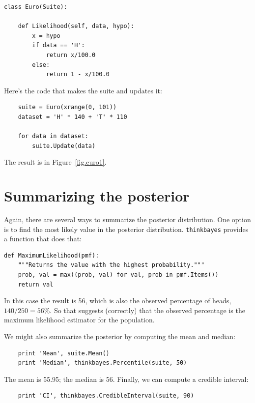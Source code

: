 \documentclass[12pt]{book}
\begin{document}
\begin{verbatim}
class Euro(Suite):

    def Likelihood(self, data, hypo):
        x = hypo
        if data == 'H':
            return x/100.0
        else:
            return 1 - x/100.0
\end{verbatim}

Here's the code that makes the suite and updates it:

\begin{verbatim}
    suite = Euro(xrange(0, 101))
    dataset = 'H' * 140 + 'T' * 110

    for data in dataset:
        suite.Update(data)
\end{verbatim}

The result is in Figure~\ref{fig.euro1}.


\section{Summarizing the posterior}

Again, there are several ways to summarize the posterior distribution.
One option is to find the most likely value in the posterior
distribution.  \verb"thinkbayes" provides a function that does 
that:

\begin{verbatim}
def MaximumLikelihood(pmf):
    """Returns the value with the highest probability."""
    prob, val = max((prob, val) for val, prob in pmf.Items())
    return val
\end{verbatim}

In this case the result is 56, which is also the observed percentage of
heads, $140/250 = 56\%$.  So that suggests (correctly) that the
observed percentage is the maximum likelihood estimator
for the population.

We might also summarize the posterior by computing the mean
and median:

\begin{verbatim}
    print 'Mean', suite.Mean()
    print 'Median', thinkbayes.Percentile(suite, 50)
\end{verbatim}

The mean is 55.95; the median is 56.  Finally, we can compute a
credible interval: 

\begin{verbatim}
    print 'CI', thinkbayes.CredibleInterval(suite, 90)
\end{verbatim}
\end{document}
